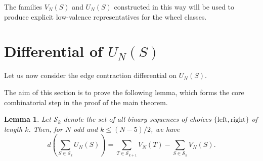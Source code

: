 \documentclass[11pt]{article}
\theoremstyle{definition}
\theoremstyle{plain}
\newtheorem{lemma}[definition]{Lemma}
\newcommand{\LeftChoice}{\mathrm{left}}
\newcommand{\RightChoice}{\mathrm{right}}
\begin{document}
The families $V_N(S)$ and $U_N(S)$ constructed in this way will be used to produce explicit low-valence representatives for the wheel classes.

\section[Differential of the family U\_N(S)]{Differential of \texorpdfstring{$U_N(S)$}{U_N(S)}}

Let us now consider the edge contraction differential on $U_N(S)$. 

The aim of this section is to prove the following lemma, which forms the core combinatorial step in the proof of the main theorem.
\begin{lemma}\label{lem:differential-UN}
Let $\mathcal{S}_k$ denote the set of all binary sequences of choices $\{\LeftChoice, \RightChoice\}$ of length $k$.
Then, for $N$ odd and $k\le(N-5)/2$, we have
\[
 d \left(\sum_{S \in \mathcal{S}_k} U_N(S) \right)
 = \sum_{T \in \mathcal{S}_{k+1}} V_N(T) - \sum_{S \in \mathcal{S}_k} V_N(S).
\]
\end{lemma}
\end{document}
